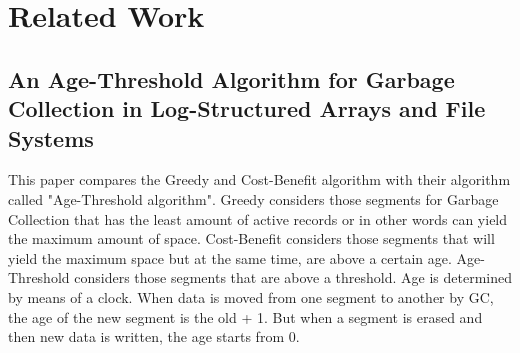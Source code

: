 %
%


\section{Related Work}
\subsection{An Age-Threshold Algorithm for Garbage Collection in Log-Structured Arrays and File Systems}
	This paper compares the Greedy and Cost-Benefit algorithm with their algorithm called "Age-Threshold algorithm". Greedy considers those segments for Garbage Collection that has the least amount of active records or in other words can yield the maximum amount of space. Cost-Benefit considers those segments that will yield the maximum space but at the same time, are above a certain age. Age-Threshold considers those segments that are above a threshold. Age is determined by means of a clock. When data is moved from one segment to another by GC, the age of the new segment is the old + 1. But when a segment is erased and then new data is written, the age starts from 0. 

